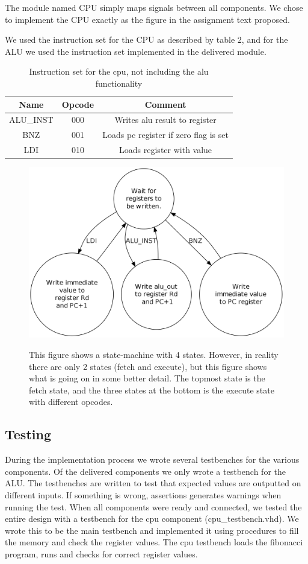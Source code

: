 \documentclass[11pt]{report}
\begin{document}
The module named CPU simply maps signals between all components.  
We chose to implement the CPU exactly as the figure in the assignment text proposed.

We used the instruction set for the CPU as described by table 2, and for the ALU we
used the instruction set implemented in the delivered module.

\begin{table}[h]
  \centering
  \begin{tabular}{|c|c|c|}
    \hline
    Name&Opcode&Comment \\
    \hline
    ALU\_INST&000&Writes alu result to register\\
    BNZ&001&Loads pc register if zero flag is set\\
    LDI&010&Loads register with value\\
    \hline
  \end{tabular}
  \caption{Instruction set for the cpu, not including the alu functionality}
\end{table}

\begin{figure}
\centering
\includegraphics[width=.75\linewidth]{state_diagram.png} \\
\caption{This figure shows a state-machine with 4 states. However, in reality there 
are only 2 states (fetch and execute), but this figure shows what is going on in some 
better detail. The topmost state is the fetch state, and the three states at the 
bottom is the execute state with different opcodes.}
\end{figure}

\subsection*{Testing}

During the implementation process we wrote several testbenches
for the various components. Of the delivered components we only wrote a testbench
for the ALU. The testbenches are written to test
that expected values are outputted on different inputs. If something is wrong, 
assertions generates warnings when running the test. 
When all components were ready and connected, we tested the entire 
design with a testbench for the cpu component (cpu\_testbench.vhd).  
We wrote this to be the main testbench and implemented it using procedures 
to fill the memory and check the register values. The cpu testbench loads the 
fibonacci program, runs and checks for correct register values.
\end{document}
